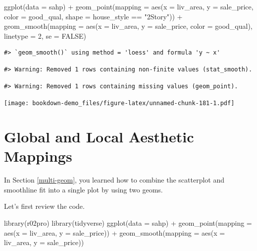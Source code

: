 \documentclass[
]{book}
\newenvironment{Shaded}{\begin{snugshade}}{\end{snugshade}}
\newcommand{\AttributeTok}[1]{\textcolor[rgb]{0.77,0.63,0.00}{#1}}
\newcommand{\ConstantTok}[1]{\textcolor[rgb]{0.00,0.00,0.00}{#1}}
\newcommand{\DecValTok}[1]{\textcolor[rgb]{0.00,0.00,0.81}{#1}}
\newcommand{\FunctionTok}[1]{\textcolor[rgb]{0.00,0.00,0.00}{#1}}
\newcommand{\NormalTok}[1]{#1}
\newcommand{\SpecialCharTok}[1]{\textcolor[rgb]{0.00,0.00,0.00}{#1}}
\newcommand{\StringTok}[1]{\textcolor[rgb]{0.31,0.60,0.02}{#1}}
\begin{document}
\begin{Shaded}
\begin{Highlighting}[]
\FunctionTok{ggplot}\NormalTok{(}\AttributeTok{data =}\NormalTok{ sahp) }\SpecialCharTok{+} \FunctionTok{geom\_point}\NormalTok{(}\AttributeTok{mapping =} \FunctionTok{aes}\NormalTok{(}\AttributeTok{x =}\NormalTok{ liv\_area, }\AttributeTok{y =}\NormalTok{ sale\_price, }\AttributeTok{color =}\NormalTok{ good\_qual, }\AttributeTok{shape =}\NormalTok{ house\_style }\SpecialCharTok{==} \StringTok{"2Story"}\NormalTok{)) }\SpecialCharTok{+} \FunctionTok{geom\_smooth}\NormalTok{(}\AttributeTok{mapping =} \FunctionTok{aes}\NormalTok{(}\AttributeTok{x =}\NormalTok{ liv\_area, }\AttributeTok{y =}\NormalTok{ sale\_price, }\AttributeTok{color =}\NormalTok{ good\_qual), }\AttributeTok{linetype =} \DecValTok{2}\NormalTok{, }\AttributeTok{se =} \ConstantTok{FALSE}\NormalTok{)}
\end{Highlighting}
\end{Shaded}

\begin{verbatim}
#> `geom_smooth()` using method = 'loess' and formula 'y ~ x'
\end{verbatim}

\begin{verbatim}
#> Warning: Removed 1 rows containing non-finite values (stat_smooth).
\end{verbatim}

\begin{verbatim}
#> Warning: Removed 1 rows containing missing values (geom_point).
\end{verbatim}

\texttt{[image: bookdown-demo\_files/figure-latex/unnamed-chunk-181-1.pdf]}

\hypertarget{global-local-mapping}{%
\section{Global and Local Aesthetic Mappings}\label{global-local-mapping}}

In Section \ref{multi-geom}, you learned how to combine the scatterplot and smoothline fit into a single plot by using two geoms.

Let's first review the code.

\begin{Shaded}
\begin{Highlighting}[]
\FunctionTok{library}\NormalTok{(r02pro)}
\FunctionTok{library}\NormalTok{(tidyverse)}
\FunctionTok{ggplot}\NormalTok{(}\AttributeTok{data =}\NormalTok{ sahp) }\SpecialCharTok{+} \FunctionTok{geom\_point}\NormalTok{(}\AttributeTok{mapping =} \FunctionTok{aes}\NormalTok{(}\AttributeTok{x =}\NormalTok{ liv\_area, }\AttributeTok{y =}\NormalTok{ sale\_price)) }\SpecialCharTok{+} \FunctionTok{geom\_smooth}\NormalTok{(}\AttributeTok{mapping =} \FunctionTok{aes}\NormalTok{(}\AttributeTok{x =}\NormalTok{ liv\_area, }\AttributeTok{y =}\NormalTok{ sale\_price))}
\end{Highlighting}
\end{Shaded}
\end{document}
